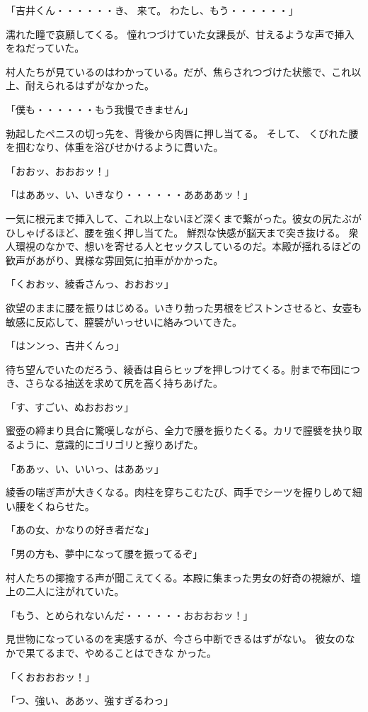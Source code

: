 ﻿\documentclass[book,tate]{jlreq}
\begin{document}
「吉井くん・・・・・・き、 来て。 わたし、もう・・・・・・」

濡れた瞳で哀願してくる。 憧れつづけていた女課長が、甘えるような声で挿入をねだっていた。

村人たちが見ているのはわかっている。だが、焦らされつづけた状態で、これ以上、耐えられるはずがなかった。

「僕も・・・・・・もう我慢できません」

勃起したペニスの切っ先を、背後から肉唇に押し当てる。 そして、 くびれた腰を掴むなり、体重を浴びせかけるように貫いた。

「おおッ、おおおッ！」

「はああッ、い、いきなり・・・・・・ああああッ！」

一気に根元まで挿入して、これ以上ないほど深くまで繋がった。彼女の尻たぶがひしゃげるほど、腰を強く押し当てた。 鮮烈な快感が脳天まで突き抜ける。 衆人環視のなかで、想いを寄せる人とセックスしているのだ。本殿が揺れるほどの 歓声があがり、異様な雰囲気に拍車がかかった。

「くおおッ、綾香さんっ、おおおッ」

欲望のままに腰を振りはじめる。いきり勃った男根をピストンさせると、女壺も敏感に反応して、膣襞がいっせいに絡みついてきた。

「はンンっ、吉井くんっ」

待ち望んでいたのだろう、綾香は自らヒップを押しつけてくる。肘まで布団につき、さらなる抽送を求めて尻を高く持ちあげた。

「す、すごい、ぬおおおッ」

蜜壺の締まり具合に驚嘆しながら、全力で腰を振りたくる。カリで膣襞を抉り取るように、意識的にゴリゴリと擦りあげた。

「ああッ、い、いいっ、はああッ」

綾香の喘ぎ声が大きくなる。肉柱を穿ちこむたび、両手でシーツを握りしめて細い腰をくねらせた。

「あの女、かなりの好き者だな」

「男の方も、夢中になって腰を振ってるぞ」

村人たちの揶揄する声が聞こえてくる。本殿に集まった男女の好奇の視線が、壇上の二人に注がれていた。

「もう、とめられないんだ・・・・・・おおおおッ！」

見世物になっているのを実感するが、今さら中断できるはずがない。 彼女のなかで果てるまで、やめることはできな かった。

「くおおおおッ！」

「つ、強い、ああッ、強すぎるわっ」
\end{document}
